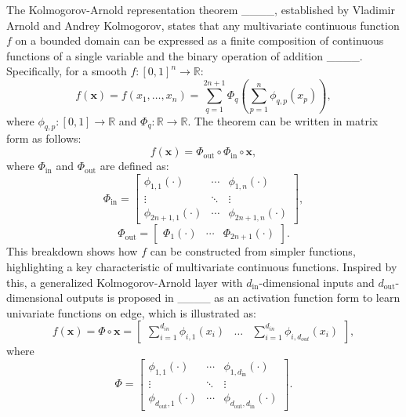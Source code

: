 The Kolmogorov-Arnold representation theorem ____, established by Vladimir Arnold and Andrey Kolmogorov, states that any multivariate continuous function $f$ on a bounded domain can be expressed as a finite composition of continuous functions of a single variable and the binary operation of addition ____. Specifically, for a smooth $f: [0,1]^n \to \mathbb{R}$:
\begin{equation}
f(\mathbf{x}) = f(x_1, \ldots, x_n) = \sum_{q=1}^{2n+1} \Phi_q\left(\sum_{p=1}^{n} \phi_{q,p}(x_p)\right),
\end{equation}
where $\phi_{q,p}: [0,1] \to \mathbb{R}$ and $\Phi_q: \mathbb{R} \to \mathbb{R}$. The theorem can be written in matrix form as follows:
\begin{equation}
    f(\mathbf{x}) = \Phi_{\text{out}} \circ \Phi_{\text{in}} \circ \mathbf{x} \label{eq:kan_vector},
\end{equation}
where $\Phi_{\text{in}}$ and $\Phi_{\text{out}}$ are defined as:
\begin{equation}
    \Phi_{\text{in}} = \begin{bmatrix}
\phi_{1,1}(\cdot) & \cdots & \phi_{1,n}(\cdot) \\
\vdots & \ddots & \vdots \\
\phi_{2n+1,1}(\cdot) & \cdots & \phi_{2n+1,n}(\cdot)
\end{bmatrix},
\end{equation}
\begin{equation}
    \Phi_{\text{out}} = \begin{bmatrix}
\Phi_1(\cdot) & \cdots & \Phi_{2n+1}(\cdot)
\end{bmatrix}.
\end{equation}
This breakdown shows how $f$ can be constructed from simpler functions, highlighting a key characteristic of multivariate continuous functions. Inspired by this, a generalized Kolmogorov-Arnold layer with $d_\text{in}$-dimensional inputs and $d_\text{out}$-dimensional outputs is proposed in ____ as an activation function form to learn univariate functions on edge, which is illustrated as:
\begin{equation}
    f(\mathbf{x}) = \Phi \circ \mathbf{x} = \begin{bmatrix}\sum_{i=1}^{d_{in}} \phi_{i,1}(x_i) & \dots& \sum_{i=1}^{d_{in}} \phi_{i,d_{out}}(x_i)\end{bmatrix}, \label{eq:kan_layer}
\end{equation}
where
\begin{equation}
\Phi = \begin{bmatrix}
\phi_{1,1}(\cdot) & \cdots & \phi_{1,d_{\text{in}}}(\cdot) \\
\vdots & \ddots & \vdots \\
\phi_{d_{\text{out}},1}(\cdot) & \cdots & \phi_{d_{\text{out}},d_{\text{in}}}(\cdot)
\end{bmatrix}.
\end{equation}
